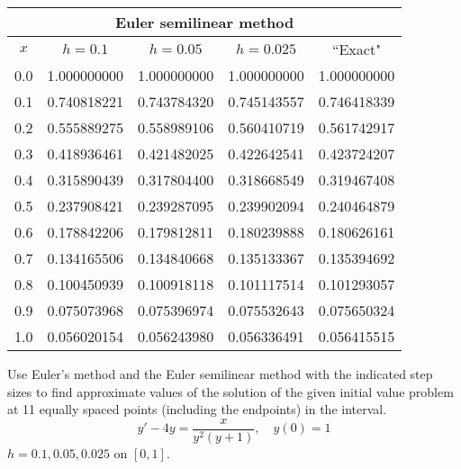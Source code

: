 \documentclass{ximera}
\begin{document}
\begin{problem}
\begin{solution}
{\small
\begin{tabular}{|c|r|r|r|r|}
\hline
\multicolumn{5}{|c|}{Euler semilinear method}\\\hline
\multicolumn{1}{|c|}{$x$}&
\multicolumn{1}{|c|}{$h=0.1$}&
\multicolumn{1}{|c|}{$h=0.05$}&
\multicolumn{1}{|c|}{$h=0.025$}&
\multicolumn{1}{|c|}{``Exact"}\\ \hline
0.0 & 1.000000000 & 1.000000000 & 1.000000000 & 1.000000000 \\
0.1 & 0.740818221 & 0.743784320 & 0.745143557 & 0.746418339 \\
0.2 & 0.555889275 & 0.558989106 & 0.560410719 & 0.561742917 \\
0.3 & 0.418936461 & 0.421482025 & 0.422642541 & 0.423724207 \\
0.4 & 0.315890439 & 0.317804400 & 0.318668549 & 0.319467408 \\
0.5 & 0.237908421 & 0.239287095 & 0.239902094 & 0.240464879 \\
0.6 & 0.178842206 & 0.179812811 & 0.180239888 & 0.180626161 \\
0.7 & 0.134165506 & 0.134840668 & 0.135133367 & 0.135394692 \\
0.8 & 0.100450939 & 0.100918118 & 0.101117514 & 0.101293057 \\
0.9 & 0.075073968 & 0.075396974 & 0.075532643 & 0.075650324 \\
1.0 & 0.056020154 & 0.056243980 & 0.056336491 & 0.056415515 \\
\hline
\end{tabular}}

\end{solution}
\end{problem}

\begin{problem}\label{exer:3.1.21} Use Euler's method and the Euler semilinear method
with the indicated  step sizes to find approximate values
of the solution of the given initial value problem at 11 equally
spaced points (including the endpoints) in the interval.
$$y'-4y=\frac{x}{y^2(y+1)},\quad y(0)=1$$
 $h=0.1,0.05,0.025$ on $[0,1]$.
 \end{problem}
\end{document}
